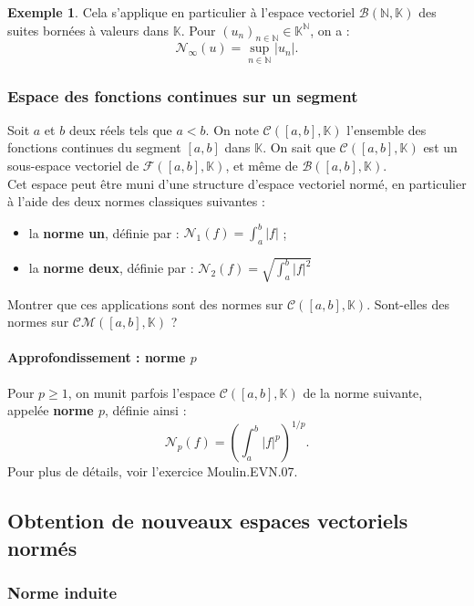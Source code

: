 \documentclass[french]{article}
\newcommand{\N}{\mathbb{N}}
\newcommand{\K}{\mathbb{K}}
\theoremstyle{plain}
\theoremstyle{definition}
\newtheorem*{ex}{Exemple}
\theoremstyle{remark}
\begin{document}
\begin{ex}
	Cela s'applique en particulier à l'espace vectoriel $\mathcal{B}(\N,\K)$ des suites bornées à valeurs dans $\K$. Pour $(u_n)_{n\in\N}\in\K^\N$, on a : $$\mathcal{N}_\infty(u)=\underset{n\in\N}{\sup}\lvert u_n\rvert.$$
\end{ex}

\subsubsection*{Espace des fonctions continues sur un segment}

Soit $a$ et $b$ deux réels tels que $a<b$. On note $\mathcal{C}([a,b],\K)$ l'ensemble des fonctions continues du segment $[a,b]$ dans $\K$. On sait que $\mathcal{C}([a,b],\K)$ est un sous-espace vectoriel de $\mathcal{F}([a,b],\K)$, et même de $\mathcal{B}([a,b],\K)$.\\
Cet espace peut être muni d'une structure d'espace vectoriel normé, en particulier à l'aide des deux normes classiques suivantes :
\begin{itemize}
	\item la \textbf{norme un}, définie par : $\mathcal{N}_1(f)=\displaystyle\int_{a}^{b}\lvert f\rvert$ ;
	\item la \textbf{norme deux}, définie par : $\mathcal{N}_2(f)=\displaystyle\sqrt{\int_{a}^{b}\lvert f\rvert^2}$
\end{itemize}

\begin{exo}
	Montrer que ces applications sont des normes sur $\mathcal{C}([a,b],\K)$. Sont-elles des normes sur $\mathcal{CM}([a,b],\K)$ ?
\end{exo}

\paragraph{Approfondissement : norme $p$} Pour $p\geqslant 1$, on munit parfois l'espace $\mathcal{C}([a,b],\K)$ de la norme suivante, appelée \textbf{norme $p$}, définie ainsi : $$\mathcal{N}_p(f)=\left(\int_{a}^{b}\lvert f\rvert^p\right)^{1/p}.$$
Pour plus de détails, voir l'exercice Moulin.EVN.07.

\subsection{Obtention de nouveaux espaces vectoriels normés}

\subsubsection*{Norme induite}
\end{document}
